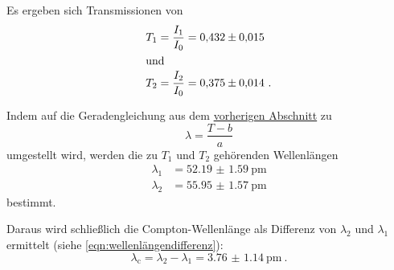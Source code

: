 Es ergeben sich Transmissionen von
\begin{align*}
  T_1 &= \frac{I_1}{I_0} = \num{0.432(15)} \\
\intertext{und}
  T_2 &= \frac{I_2}{I_0} = \num{0.375(14)} \ .
\end{align*}

Indem auf die Geradengleichung aus dem \hyperref[sec:auswertung:transmission]{vorherigen Abschnitt} zu
\[ \lambda = \frac{T-b}{a} \]
umgestellt wird,
werden die zu $T_1$ und $T_2$ gehörenden Wellenlängen
\begin{align*}
  \lambda_1 &= \SI{52.19(159)}{\pico\meter} \\
  \lambda_2 &= \SI{55.95(157)}{\pico\meter}
\end{align*}
bestimmt.

Daraus wird schließlich die Compton-Wellenlänge als Differenz von $\lambda_2$ und $\lambda_1$ ermittelt
(siehe \eqref{eqn:wellenlängendifferenz}):
\[ \lambda_\text{c} = \lambda_2 - \lambda_1 = \SI{3.76(114)}{\pico\meter} \ . \]
